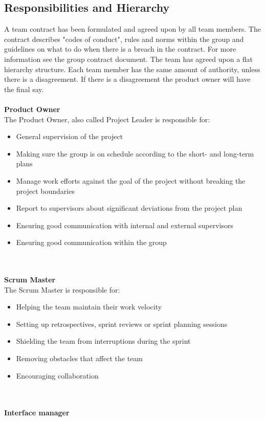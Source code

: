 \subsection{Responsibilities and Hierarchy}

A team contract has been formulated and agreed upon by all team members. The contract describes "codes of conduct", rules and norms within the group and guidelines on what to do when there is a breach in the contract. For more information see the group contract document. The team has agreed upon a flat hierarchy structure. Each team member has the same amount of authority, unless there is a disagreement. If there is a disagreement the product owner will have the final say.
\\\\
\textbf{Product Owner}\\
The Product Owner, also called Project Leader is responsible for: 
\begin{itemize}
  \item General supervision of the project
  \item Making sure the group is on schedule according to the short- and long-term plans
  \item Manage work efforts against the goal of the project without breaking the project boundaries 
  \item Report to supervisors about significant deviations from the project plan
  \item Ensuring good communication with internal and external supervisors
  \item Ensuring good communication within the group
\end{itemize}
\\\\
\textbf{Scrum Master}\\
The Scrum Master is responsible for: 
\begin{itemize}
  \item Helping the team maintain their work velocity
  \item Setting up retrospectives, sprint reviews or sprint planning sessions
  \item Shielding the team from interruptions during the sprint
  \item Removing obstacles that affect the team
  \item Encouraging collaboration
\end{itemize}
\\\\
\textbf{Interface manager}\\
